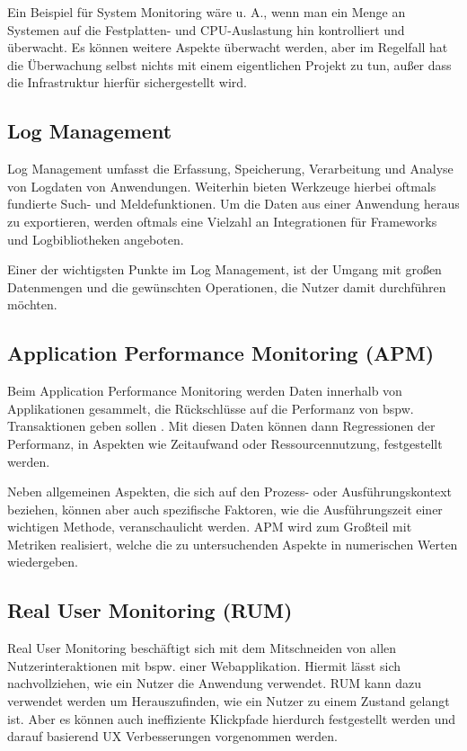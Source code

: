 Ein Beispiel für System Monitoring wäre u. A., wenn man ein Menge an Systemen auf die Festplatten- und CPU-Auslastung hin kontrolliert und überwacht. Es können weitere Aspekte überwacht werden, aber im Regelfall hat die Überwachung selbst nichts mit einem eigentlichen Projekt zu tun, außer dass die Infrastruktur hierfür sichergestellt wird.

\subsection{Log Management}

Log Management umfasst die Erfassung, Speicherung, Verarbeitung und Analyse von Logdaten von Anwendungen. Weiterhin bieten Werkzeuge hierbei oftmals fundierte Such- und Meldefunktionen. Um die Daten aus einer Anwendung heraus zu exportieren, werden oftmals eine Vielzahl an Integrationen für Frameworks und Logbibliotheken angeboten.

Einer der wichtigsten Punkte im Log Management, ist der Umgang mit großen Datenmengen und die gewünschten Operationen, die Nutzer damit durchführen möchten.

\subsection{Application Performance Monitoring (APM)}

Beim Application Performance Monitoring werden Daten innerhalb von Applikationen gesammelt, die Rückschlüsse auf die Performanz von bspw. Transaktionen geben sollen \cite{StudyingTheEffectivenessOfAPMTools}. Mit diesen Daten können dann Regressionen der Performanz, in Aspekten wie Zeitaufwand oder Ressourcennutzung, festgestellt werden.

Neben allgemeinen Aspekten, die sich auf den Prozess- oder Ausführungskontext beziehen, können aber auch spezifische Faktoren, wie die Ausführungszeit einer wichtigen Methode, veranschaulicht werden. APM wird zum Großteil mit Metriken realisiert, welche die zu untersuchenden Aspekte in numerischen Werten wiedergeben.

\subsection{Real User Monitoring (RUM)}

Real User Monitoring beschäftigt sich mit dem Mitschneiden von allen Nutzerinteraktionen mit bspw. einer Webapplikation. Hiermit lässt sich nachvollziehen, wie ein Nutzer die Anwendung verwendet. RUM kann dazu verwendet werden um Herauszufinden, wie ein Nutzer zu einem Zustand gelangt ist. Aber es können auch ineffiziente Klickpfade hierdurch festgestellt werden und darauf basierend UX Verbesserungen vorgenommen werden.

